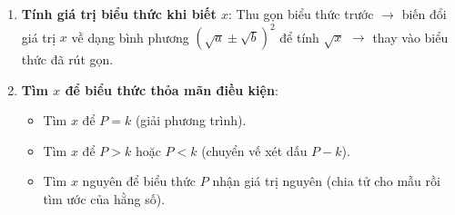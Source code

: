 \begin{enumerate}
\item \textbf{Tính giá trị biểu thức khi biết $x$}: Thu gọn biểu thức trước $\rightarrow$ biến đổi giá trị $x$ về dạng bình phương $(\sqrt{a} \pm \sqrt{b})^2$ để tính $\sqrt{x}$ $\rightarrow$ thay vào biểu thức đã rút gọn.
\item \textbf{Tìm $x$ để biểu thức thỏa mãn điều kiện}:
\begin{itemize}
\item Tìm $x$ để $P = k$ (giải phương trình).
\item Tìm $x$ để $P > k$ hoặc $P < k$ (chuyển vế xét dấu $P - k$).
\item Tìm $x$ nguyên để biểu thức $P$ nhận giá trị nguyên (chia tử cho mẫu rồi tìm ước của hằng số).
\end{itemize}
\end{enumerate}
